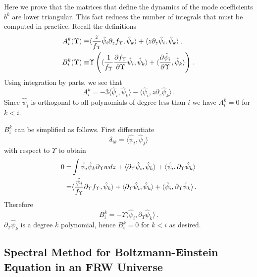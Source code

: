 \label{lower_triang}
Here we prove that the matrices that define the dynamics of the mode coefficients $b^k$ are lower triangular. This fact reduces the number of integrals that must be computed in practice.  Recall the definitions
\begin{align}
A^k_i(\Upsilon)\equiv&\langle\frac{z}{f_\Upsilon }\hat\psi_i\partial_zf_\Upsilon ,\hat\psi_k\rangle+\langle z\partial_z \hat\psi_i,\hat\psi_k\rangle\,,\\
B^k_i(\Upsilon)\equiv &\Upsilon\left(\langle\frac{1}{f_\Upsilon }\frac{\partial f_\Upsilon }{\partial\Upsilon}\hat\psi_i,\hat\psi_k\rangle+\langle\frac{\partial\hat{\psi}_i}{\partial \Upsilon},\hat\psi_k\rangle\right)\,.\notag
\end{align}
Using integration by parts, we see that
\begin{equation}
A^k_i=-3\langle\hat\psi_i,\hat\psi_k\rangle-\langle \hat \psi_i,z\partial_z\hat\psi_k\rangle\,.
\end{equation}
Since $\hat\psi_i$ is orthogonal to all polynomials of degree less than $i$ we have $A^k_i=0$ for  $k<i$.  

$B^k_i$ can be simplified as follows.  First differentiate 
\begin{equation}
\delta_{ik}=\langle \hat\psi_i,\hat\psi_j\rangle
\end{equation}
with respect to $\Upsilon$ to obtain
\begin{align}
0=&\int \hat\psi_i\hat\psi_k\partial_{\Upsilon}wdz+\langle \partial_{\Upsilon}\hat\psi_i,\hat\psi_k\rangle+\langle \hat\psi_i,\partial_{\Upsilon}\hat\psi_k\rangle\\
=&\langle\frac{\hat\psi_i}{f_\Upsilon}\partial_{\Upsilon}f_\Upsilon,\hat\psi_k \rangle+\langle\partial_{\Upsilon}\hat\psi_i,\hat\psi_k\rangle+\langle \hat\psi_i,\partial_{\Upsilon}\hat\psi_k\rangle\,.\notag
\end{align}
Therefore 
\begin{equation}
B^k_i=-\Upsilon\langle\hat\psi_i,\partial_{\Upsilon}\hat\psi_k\rangle\,.
\end{equation}
$\partial_\Upsilon \hat\psi_k$ is a degree $k$ polynomial, hence $B_i^k=0$ for $k<i$ as desired.



\subsection{Spectral Method for Boltzmann-Einstein Equation  in an FRW Universe}\label{the_method}


